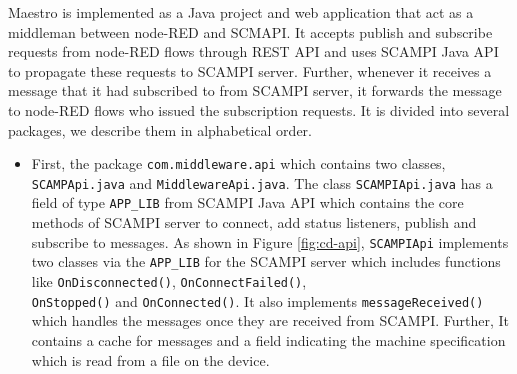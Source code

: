 Maestro is implemented as a Java project and web application that act as a middleman between node-RED and SCMAPI. It accepts publish and subscribe requests from node-RED flows through REST API and uses  SCAMPI Java API to propagate these requests to SCAMPI server. Further, whenever it receives a message that it had subscribed to from SCAMPI server, it forwards the message to  node-RED flows who issued the subscription requests. It is divided into several packages, we describe them in alphabetical order.
 \begin{itemize}
 
  \item First, the package \verb|com.middleware.api| which contains two classes, \verb|SCAMPApi.java|  and \verb|MiddlewareApi.java|. The class \verb|SCAMPIApi.java| has a field of type \verb|APP_LIB| from SCAMPI Java API which contains the core methods of SCAMPI server to connect, add status listeners, publish and subscribe to messages.  As shown in Figure \ref{fig:cd-api}, \verb|SCAMPIApi| implements two classes via the \verb|APP_LIB| for the SCAMPI server which includes functions like \verb|OnDisconnected()|, \verb|OnConnectFailed()|,\\  \verb|OnStopped()| and  \verb|OnConnected()|. It also implements \verb|messageReceived()| which handles the messages once they are received from SCAMPI. Further, It contains a cache for messages and a field indicating the machine specification which is read from a file on the device.
 

\end{itemize}
